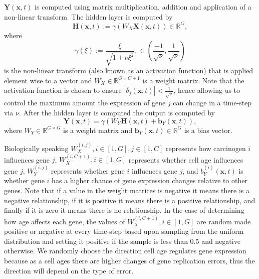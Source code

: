 \documentclass[\main/thesis.tex]{subfiles}
\begin{document}
$\boldsymbol{Y}(\boldsymbol{x}, t)$ is computed using matrix multiplication, addition and 
application of a non-linear transform. The hidden layer is computed by
\begin{equation}
\boldsymbol{H}(\boldsymbol{x}, t) {:=} \gamma(W_{X} \boldsymbol{X}(\boldsymbol{x}, t))
{\in} \mathbb{R}^{G},
\label{eq:geneExprNN_HiddenLayer}
\end{equation}
where
\begin{equation}
\gamma(\xi) {:=} \frac{\xi}
                      {\sqrt{1 {+} \nu \xi^2}},
{\in} \left(
        \frac{\minus 1}
             {\sqrt{\nu}},
        \frac{1}
             {\sqrt{\nu}}
      \right) 
\label{eq:geneExprNN_ActivationFunc}
\end{equation}
is the non-linear transform (also known as an activation function) that is applied element wise to a vector and $W_{X} {\in} \mathbb{R}^{G {\times} C {+} 1}$ is a weight matrix. Note that the activation function is chosen to ensure $|\overline{\delta}_j(\boldsymbol{x}, t)| < \frac{1}{\sqrt{\nu}}$, hence allowing us to control the maximum amount the expression of gene $j$ can change in a time-step via $\nu$. After the hidden layer is computed the output is computed by
\begin{equation}
\boldsymbol{Y}(\boldsymbol{x}, t) {=} \gamma(W_{Y} \boldsymbol{H}(\boldsymbol{x}, t) {+} \boldsymbol{b}_{Y}(\boldsymbol{x}, t)), 
\label{eq:geneExprNN_OutputLayer}
\end{equation}
where $W_{Y} {\in} \mathbb{R}^{G {\times} G}$ is a weight matrix and
$\boldsymbol{b}_{Y}(\boldsymbol{x}, t) {\in} \mathbb{R}^G$ is a bias vector. 

Biologically speaking $W_{X}^{(i,j)}, i {\in} [1, G], j {\in} [1, C]$ represents how 
carcinogen $i$ influences gene $j$, $W_{X}^{(i,C {+} 1)}, i {\in} [1, G]$ represents whether cell age influences gene $j$, $W_{Y}^{(i,j)}$ represents whether gene $i$ influences 
gene $j$, and $b_{Y}^{(i)}(\boldsymbol{x}, t)$ is whether gene $i$ has a 
higher chance of gene expression changes relative to other genes. Note that if a 
value in the weight matrices is negative it means there is a negative relationship, 
if it is positive it means there is a positive relationship, and finally if it is 
zero it means there is no relationship. In the case of determining how age affects 
each gene, the values of $W_{X}^{(i,C {+} 1)}, i {\in} [1, G]$ are random made 
positive or negative at every time-step based upon sampling from the uniform distribution and setting it 
positive if the sample is less than 0.5 and negative otherwise. We randomly choose the direction cell age regulates gene expression because as a cell ages there are higher changes of gene replication errors, thus the direction will depend on the type of error.  
\end{document}
